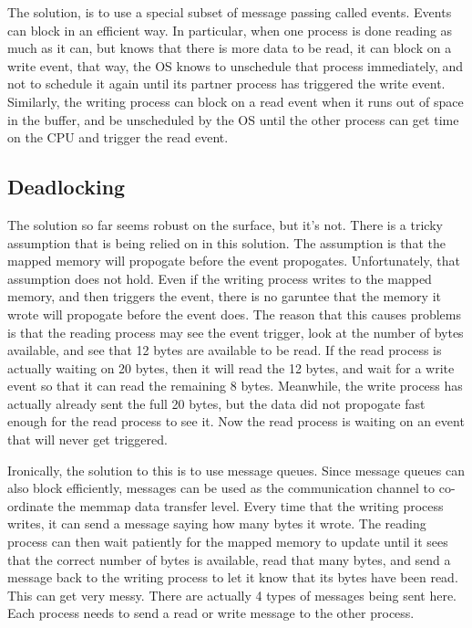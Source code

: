 \documentclass[se]{uw-wkrpt}
\begin{document}
The solution, is to use a special subset of message passing
called events. Events can block in an efficient way. In particular, when one process is done reading as much as 
it can, but knows that there is more data to be read, it can block on a write event, that way, the OS knows to
unschedule that process immediately, and not to schedule it again until its partner process has triggered the write
event. Similarly, the writing process can block on a read event when it runs out of space in the buffer, and be 
unscheduled by the OS until the other process can get time on the CPU and trigger the read event.

\subsection{Deadlocking}

The solution so far seems robust on the surface, but it's not. There is a tricky assumption that is being relied
on in this solution. The assumption is that the mapped memory will propogate before the event propogates. Unfortunately,
that assumption does not hold. Even if the writing process writes to the mapped memory, and then triggers the event, there
is no garuntee that the memory it wrote will propogate before the event does. The reason that this causes problems
is that the reading process may see the event trigger, look at the number of bytes available, and see that 12 bytes are
available to be read. If the read process is actually waiting on 20 bytes, then it will read the 12 bytes, and wait for
a write event so that it can read the remaining 8 bytes. Meanwhile, the write process has actually already sent the full
20 bytes, but the data did not propogate fast enough for the read process to see it. Now the read process is waiting
on an event that will never get triggered.

Ironically, the solution to this is to use message queues. Since message queues can also block efficiently, messages can
be used as the communication channel to co-ordinate the memmap data transfer level. Every time that the writing process
writes, it can send a message saying how many bytes it wrote. The reading process can then wait patiently for the mapped
memory to update until it sees that the correct number of bytes is available, read that many bytes, and send a message
back to the writing process to let it know that its bytes have been read. This can get very messy. There are actually
4 types of messages being sent here. Each process needs to send a read or write message to the other process.
\end{document}
